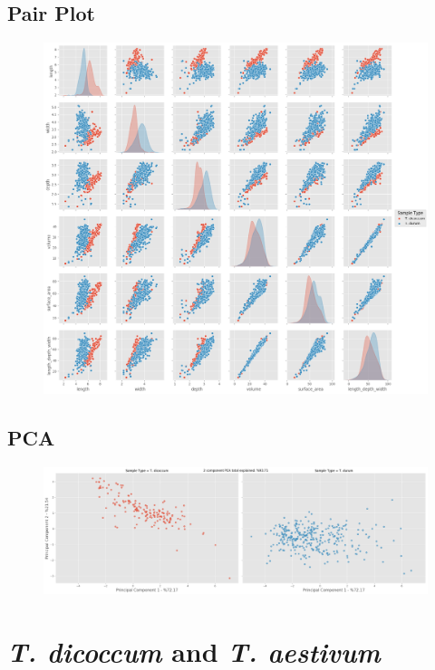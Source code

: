 \documentclass[11pt]{report}
\begin{document}
\subsection{Pair Plot}
\label{sec:org994c574}

\begin{figure}[htbp]
\centering
\includegraphics[width=18cm]{./images/results/group5/pairplot.png}
\label{fig:org9272d4a}
\end{figure}

\clearpage
\subsection{PCA}
\label{sec:org129cb40}
\begin{figure}[htbp]
\centering
\includegraphics[width=18cm]{./images/results/group5/pca.png}
\label{fig:orge7775a5}
\end{figure}

\clearpage

\section{\emph{T. dicoccum} and \emph{T. aestivum}}
\label{sec:org08413a5}
\end{document}
